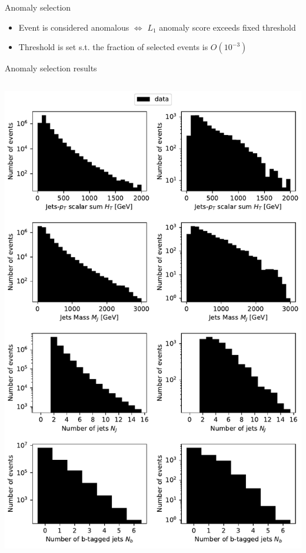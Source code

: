 \documentclass{beamer}
\begin{document}
\begin{frame}{Anomaly selection}
  \begin{itemize}
      \item<1-> Event is considered anomalous $\iff$ $L_1$ anomaly score exceeds fixed threshold
      \item<2-> Threshold is set s.t. the fraction of selected events is $O(10^{-3})$ 
  \end{itemize}
\end{frame}

\begin{frame}{Anomaly selection results}
\begin{columns}
\begin{column}{0.5\textwidth}
    \begin{center}
     \includegraphics[width=1\textwidth]{data.pdf}

\end{center}
\end{column}
\end{columns}
\end{frame}
\end{document}
